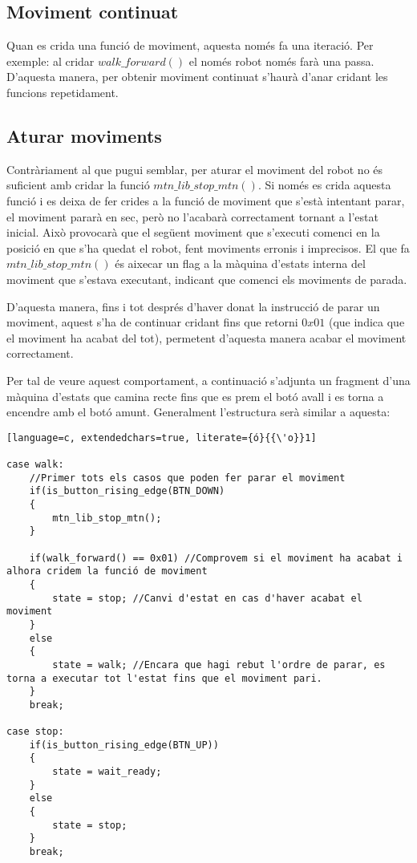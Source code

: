 \documentclass{article}
\begin{document}
\subsection{Moviment continuat}
Quan es crida una funció de moviment, aquesta només fa una iteració. Per exemple: al cridar $walk\_forward()$ el només robot només farà una passa. D'aquesta manera, per obtenir moviment continuat s'haurà d'anar cridant les funcions repetidament. 

\subsection{Aturar moviments}
Contràriament al que pugui semblar, per aturar el moviment del robot no és suficient amb cridar la funció $mtn\_lib\_stop\_mtn()$. Si només es crida aquesta funció i es deixa de fer crides a la funció de moviment que s'està intentant parar, el moviment pararà en sec, però no l'acabarà correctament tornant a l'estat inicial. Això provocarà que el següent moviment que s'executi comenci en la posició en que s'ha quedat el robot, fent moviments erronis i imprecisos. El que fa $mtn\_lib\_stop\_mtn()$ és aixecar un flag a la màquina d'estats interna del moviment que s'estava executant, indicant que comenci els moviments de parada. 

D'aquesta manera, fins i tot després d'haver donat la instrucció de parar un moviment, aquest s'ha de continuar cridant fins que retorni $0x01$ (que indica que el moviment ha acabat del tot), permetent d'aquesta manera acabar el moviment correctament. 

Per tal de veure aquest comportament, a continuació s'adjunta un fragment d'una màquina d'estats que camina recte fins que es prem el botó avall i es torna a encendre amb el botó amunt. Generalment l'estructura serà similar a aquesta:

\begin{lstlisting}[language=c, extendedchars=true, literate={ó}{{\'o}}1]

case walk: 	
	//Primer tots els casos que poden fer parar el moviment
	if(is_button_rising_edge(BTN_DOWN)
	{
		mtn_lib_stop_mtn(); 
	}

	if(walk_forward() == 0x01) //Comprovem si el moviment ha acabat i alhora cridem la funció de moviment
	{
		state = stop; //Canvi d'estat en cas d'haver acabat el moviment
	}
	else
	{
		state = walk; //Encara que hagi rebut l'ordre de parar, es torna a executar tot l'estat fins que el moviment pari.
	}
	break;	      
	  
case stop: 
	if(is_button_rising_edge(BTN_UP))
	{
		state = wait_ready;
	}
	else
	{
		state = stop;
	}
	break;
\end{lstlisting}
\end{document}

